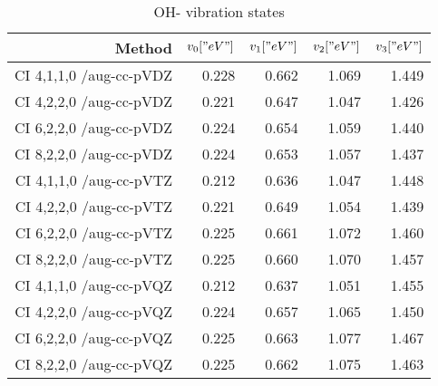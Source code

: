 \begin{table}[]
\centering
\caption{OH- vibration states}
\label{TODO}
\begin{tabular}{rrrrr}
\toprule
Method & $v_0 [" eV"]$ & $v_1 [" eV"]$ & $v_2 [" eV"]$ & $v_3[" eV"]$ \\ \midrule
CI 4,1,1,0 /aug-cc-pVDZ & 0.228 & 0.662 & 1.069 & 1.449\\
CI 4,2,2,0 /aug-cc-pVDZ & 0.221 & 0.647 & 1.047 & 1.426\\
CI 6,2,2,0 /aug-cc-pVDZ & 0.224 & 0.654 & 1.059 & 1.440\\
CI 8,2,2,0 /aug-cc-pVDZ & 0.224 & 0.653 & 1.057 & 1.437\\
CI 4,1,1,0 /aug-cc-pVTZ & 0.212 & 0.636 & 1.047 & 1.448\\
CI 4,2,2,0 /aug-cc-pVTZ & 0.221 & 0.649 & 1.054 & 1.439\\
CI 6,2,2,0 /aug-cc-pVTZ & 0.225 & 0.661 & 1.072 & 1.460\\
CI 8,2,2,0 /aug-cc-pVTZ & 0.225 & 0.660 & 1.070 & 1.457\\
CI 4,1,1,0 /aug-cc-pVQZ & 0.212 & 0.637 & 1.051 & 1.455\\
CI 4,2,2,0 /aug-cc-pVQZ & 0.224 & 0.657 & 1.065 & 1.450\\
CI 6,2,2,0 /aug-cc-pVQZ & 0.225 & 0.663 & 1.077 & 1.467\\
CI 8,2,2,0 /aug-cc-pVQZ & 0.225 & 0.662 & 1.075 & 1.463\\
\bottomrule
\end{tabular}
\end{table}
    